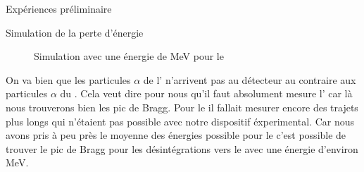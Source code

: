 \documentclass[a4paper,11pt,liststotocnumbered,bibtotocnumbered]{scrartcl}
\begin{document}
\begin{section}{Expériences préliminaire}
\begin{subsection}{Simulation de la perte d'énergie}
\begin{figure}[H]
\begin{minipage}{0.45\textwidth}
     \caption{Simulation avec une énergie de \unit[7]{MeV} pour le }
    \end{minipage}
   \end{figure}
   On va bien que les particules $\alpha$ de l' n'arrivent pas au détecteur au contraire aux particules $\alpha$ du . Cela veut dire pour nous qu'il faut absolument mesure l' car là nous trouverons bien les pic de Bragg. Pour le  il fallait mesurer encore des trajets plus longs qui n'étaient pas possible avec notre dispositif éxperimental. Car nous avons pris à peu près le moyenne des énergies possible pour le  c'est possible de trouver le pic de Bragg pour les désintégrations vers le  avec une énergie d'environ \unit[6]{MeV}.
  \end{subsection}
 \end{section}
\end{document}

